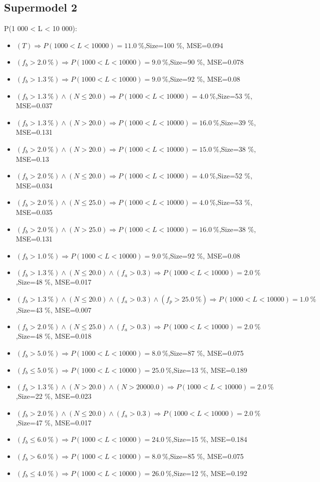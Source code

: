 \documentclass[numbered]{CSL}
\begin{document}
\subsection{Supermodel 2}
P(1 000 < L < 10 000):
\begin{itemize}
\item $(T) \Rightarrow P(1 000 < L < 10 000) = 11.0~\%$,\hfill Size=100 \%, MSE=0.094
\item $(f_b > 2.0~\%) \Rightarrow P(1 000 < L < 10 000) = 9.0~\%$,\hfill Size=90 \%, MSE=0.078
\item $(f_b > 1.3~\%) \Rightarrow P(1 000 < L < 10 000) = 9.0~\%$,\hfill Size=92 \%, MSE=0.08
\item $(f_b > 1.3~\%) \land (N \leq 20.0) \Rightarrow P(1 000 < L < 10 000) = 4.0~\%$,\hfill Size=53 \%, MSE=0.037
\item $(f_b > 1.3~\%) \land (N > 20.0) \Rightarrow P(1 000 < L < 10 000) = 16.0~\%$,\hfill Size=39 \%, MSE=0.131
\item $(f_b > 2.0~\%) \land (N > 20.0) \Rightarrow P(1 000 < L < 10 000) = 15.0~\%$,\hfill Size=38 \%, MSE=0.13
\item $(f_b > 2.0~\%) \land (N \leq 20.0) \Rightarrow P(1 000 < L < 10 000) = 4.0~\%$,\hfill Size=52 \%, MSE=0.034
\item $(f_b > 2.0~\%) \land (N \leq 25.0) \Rightarrow P(1 000 < L < 10 000) = 4.0~\%$,\hfill Size=53 \%, MSE=0.035
\item $(f_b > 2.0~\%) \land (N > 25.0) \Rightarrow P(1 000 < L < 10 000) = 16.0~\%$,\hfill Size=38 \%, MSE=0.131
\item $(f_b > 1.0~\%) \Rightarrow P(1 000 < L < 10 000) = 9.0~\%$,\hfill Size=92 \%, MSE=0.08
\item $(f_b > 1.3~\%) \land (N \leq 20.0) \land (f_a > 0.3) \Rightarrow P(1 000 < L < 10 000) = 2.0~\%$,\hfill Size=48 \%, MSE=0.017
\item $(f_b > 1.3~\%) \land (N \leq 20.0) \land (f_a > 0.3) \land (f_p > 25.0~\%) \Rightarrow P(1 000 < L < 10 000) = 1.0~\%$,\hfill Size=43 \%, MSE=0.007
\item $(f_b > 2.0~\%) \land (N \leq 25.0) \land (f_a > 0.3) \Rightarrow P(1 000 < L < 10 000) = 2.0~\%$,\hfill Size=48 \%, MSE=0.018
\item $(f_b > 5.0~\%) \Rightarrow P(1 000 < L < 10 000) = 8.0~\%$,\hfill Size=87 \%, MSE=0.075
\item $(f_b \leq 5.0~\%) \Rightarrow P(1 000 < L < 10 000) = 25.0~\%$,\hfill Size=13 \%, MSE=0.189
\item $(f_b > 1.3~\%) \land (N > 20.0) \land (N > 20000.0) \Rightarrow P(1 000 < L < 10 000) = 2.0~\%$,\hfill Size=22 \%, MSE=0.023
\item $(f_b > 2.0~\%) \land (N \leq 20.0) \land (f_a > 0.3) \Rightarrow P(1 000 < L < 10 000) = 2.0~\%$,\hfill Size=47 \%, MSE=0.017
\item $(f_b \leq 6.0~\%) \Rightarrow P(1 000 < L < 10 000) = 24.0~\%$,\hfill Size=15 \%, MSE=0.184
\item $(f_b > 6.0~\%) \Rightarrow P(1 000 < L < 10 000) = 8.0~\%$,\hfill Size=85 \%, MSE=0.075
\item $(f_b \leq 4.0~\%) \Rightarrow P(1 000 < L < 10 000) = 26.0~\%$,\hfill Size=12 \%, MSE=0.192
\end{itemize}
\end{document}
